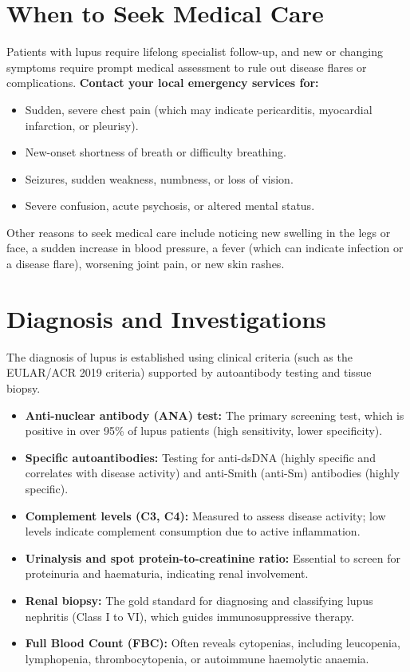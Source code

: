 \section*{When to Seek Medical Care}
Patients with lupus require lifelong specialist follow-up, and new or changing symptoms require prompt medical assessment to rule out disease flares or complications.
\textbf{Contact your local emergency services for:}
\begin{itemize}
    \item Sudden, severe chest pain (which may indicate pericarditis, myocardial infarction, or pleurisy).
    \item New-onset shortness of breath or difficulty breathing.
    \item Seizures, sudden weakness, numbness, or loss of vision.
    \item Severe confusion, acute psychosis, or altered mental status.
\end{itemize}
Other reasons to seek medical care include noticing new swelling in the legs or face, a sudden increase in blood pressure, a fever (which can indicate infection or a disease flare), worsening joint pain, or new skin rashes.

\section*{Diagnosis and Investigations}
The diagnosis of lupus is established using clinical criteria (such as the EULAR/ACR 2019 criteria) supported by autoantibody testing and tissue biopsy.
\begin{itemize}
    \item \textbf{Anti-nuclear antibody (ANA) test:} The primary screening test, which is positive in over 95\% of lupus patients (high sensitivity, lower specificity).
    \item \textbf{Specific autoantibodies:} Testing for anti-dsDNA (highly specific and correlates with disease activity) and anti-Smith (anti-Sm) antibodies (highly specific).
    \item \textbf{Complement levels (C3, C4):} Measured to assess disease activity; low levels indicate complement consumption due to active inflammation.
    \item \textbf{Urinalysis and spot protein-to-creatinine ratio:} Essential to screen for proteinuria and haematuria, indicating renal involvement.
    \item \textbf{Renal biopsy:} The gold standard for diagnosing and classifying lupus nephritis (Class I to VI), which guides immunosuppressive therapy.
    \item \textbf{Full Blood Count (FBC):} Often reveals cytopenias, including leucopenia, lymphopenia, thrombocytopenia, or autoimmune haemolytic anaemia.
\end{itemize}


